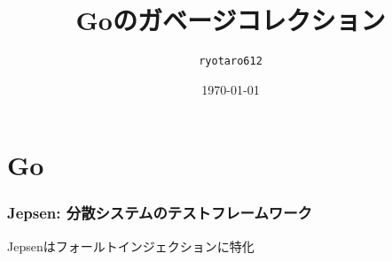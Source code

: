 \documentclass[unicode, 14pt, aspectratio=169]{beamer}
\date{\today}
\title{Goのガベージコレクション}
\author{\texttt{ryotaro612}}
\begin{document}
\begin{frame}
\titlepage
\end{frame}
\section{Go}

\begin{frame}
  \frametitle{Jepsen: 分散システムのテストフレームワーク}
  {\large Jepsenはフォールトインジェクションに特化}
\end{frame}

\end{document}
